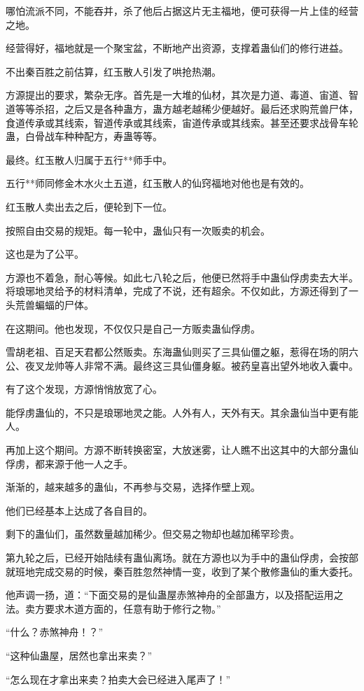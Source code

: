 \begin{this_body}
哪怕流派不同，不能吞并，杀了他后占据这片无主福地，便可获得一片上佳的经营之地。

经营得好，福地就是一个聚宝盆，不断地产出资源，支撑着蛊仙们的修行进益。

不出秦百胜之前估算，红玉散人引发了哄抢热潮。

方源提出的要求，繁杂无序。首先是一大堆的仙材，其次是力道、毒道、宙道、智道等等杀招，之后又是各种蛊方，蛊方越老越稀少便越好。最后还求购荒兽尸体，食道传承或其线索，智道传承或其线索，宙道传承或其线索。甚至还要求战骨车轮蛊，白骨战车种种配方，寿蛊等等。

最终。红玉散人归属于五行**师手中。

五行**师同修金木水火土五道，红玉散人的仙窍福地对他也是有效的。

红玉散人卖出去之后，便轮到下一位。

按照自由交易的规矩。每一轮中，蛊仙只有一次贩卖的机会。

这也是为了公平。

方源也不着急，耐心等候。如此七八轮之后，他便已然将手中蛊仙俘虏卖去大半。将琅琊地灵给予的材料清单，完成了不说，还有超余。不仅如此，方源还得到了一头荒兽蝙蝠的尸体。

在这期间。他也发现，不仅仅只是自己一方贩卖蛊仙俘虏。

雪胡老祖、百足天君都公然贩卖。东海蛊仙则买了三具仙僵之躯，惹得在场的阴六公、夜叉龙帅等人非常不满。最终这三具仙僵身躯。被药皇喜出望外地收入囊中。

有了这个发现，方源悄悄放宽了心。

能俘虏蛊仙的，不只是琅琊地灵之能。人外有人，天外有天。其余蛊仙当中更有能人。

再加上这个期间。方源不断转换密室，大放迷雾，让人瞧不出这其中的大部分蛊仙俘虏，都来源于他一人之手。

渐渐的，越来越多的蛊仙，不再参与交易，选择作壁上观。

他们已经基本上达成了各自目的。

剩下的蛊仙们，虽然数量越加稀少。但交易之物却也越加稀罕珍贵。

第九轮之后，已经开始陆续有蛊仙离场。就在方源也以为手中的蛊仙俘虏，会按部就班地完成交易的时候，秦百胜忽然神情一变，收到了某个散修蛊仙的重大委托。

他声调一扬，道：“下面交易的是仙蛊屋赤煞神舟的全部蛊方，以及搭配运用之法。卖方要求木道方面的，任意有助于修行之物。”

“什么？赤煞神舟！？”

“这种仙蛊屋，居然也拿出来卖？”

“怎么现在才拿出来卖？拍卖大会已经进入尾声了！”


\end{this_body}
